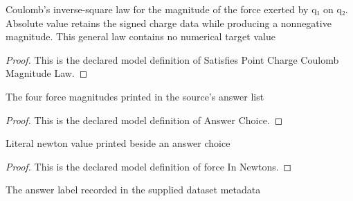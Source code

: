 \begin{definition}
  \label{def:physics:phyx-mini-0992:phyxminiproblems-problemphyxmini0992-satisfiespointchargecoulombmagnitudelaw}
  Coulomb's inverse-square law for the magnitude of the force exerted by q₁ on q₂. Absolute value retains the signed charge data while producing a nonnegative magnitude. This general law contains no numerical target value
\end{definition}
\begin{proof}
  This is the declared model definition of Satisfies Point Charge Coulomb Magnitude Law.
\end{proof}
\begin{definition}
  \label{def:physics:phyx-mini-0992:phyxminiproblems-problemphyxmini0992-answerchoice}
  The four force magnitudes printed in the source's answer list
\end{definition}
\begin{proof}
  This is the declared model definition of Answer Choice.
\end{proof}
\begin{definition}
  \label{def:physics:phyx-mini-0992:phyxminiproblems-problemphyxmini0992-answerchoice-forceinnewtons}
  Literal newton value printed beside an answer choice
\end{definition}
\begin{proof}
  This is the declared model definition of force In Newtons.
\end{proof}
\begin{definition}
  \label{def:physics:phyx-mini-0992:phyxminiproblems-problemphyxmini0992-recordeddatasetanswer}
  The answer label recorded in the supplied dataset metadata
\end{definition}
